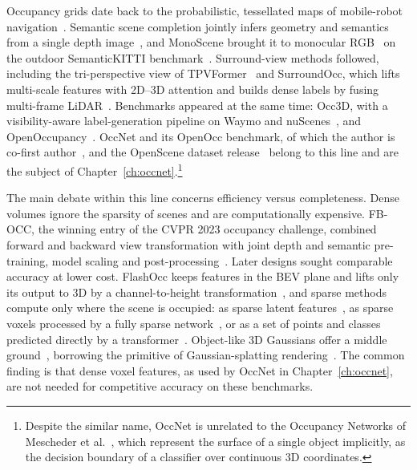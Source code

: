 Occupancy grids date back to the probabilistic, tessellated maps of mobile-robot navigation~\cite{elfes1989occupancy}. Semantic scene completion jointly infers geometry and semantics from a single depth image~\cite{song2017sscnet}, and MonoScene brought it to monocular RGB~\cite{cao2022monoscene} on the outdoor SemanticKITTI benchmark~\cite{behley2019semantickitti}. Surround-view methods followed, including the tri-perspective view of TPVFormer~\cite{huang2023tpvformer} and SurroundOcc, which lifts multi-scale features with 2D--3D attention and builds dense labels by fusing multi-frame LiDAR~\cite{wei2023surroundocc}. Benchmarks appeared at the same time: Occ3D, with a visibility-aware label-generation pipeline on Waymo and nuScenes~\cite{tian2023occ3d}, and OpenOccupancy~\cite{wang2023openoccupancy}. OccNet and its OpenOcc benchmark, of which the author is co-first author~\cite{sima2023occnet}, and the OpenScene dataset release~\cite{sima2023openscene} belong to this line and are the subject of Chapter~\ref{ch:occnet}.\footnote{Despite the similar name, OccNet is unrelated to the Occupancy Networks of Mescheder et al.~\cite{mescheder2019occupancy}, which represent the surface of a single object implicitly, as the decision boundary of a classifier over continuous 3D coordinates.}

The main debate within this line concerns efficiency versus completeness. Dense volumes ignore the sparsity of scenes and are computationally expensive. FB-OCC, the winning entry of the CVPR 2023 occupancy challenge, combined forward and backward view transformation with joint depth and semantic pre-training, model scaling and post-processing~\cite{li2023fbocc}. Later designs sought comparable accuracy at lower cost. FlashOcc keeps features in the BEV plane and lifts only its output to 3D by a channel-to-height transformation~\cite{yu2023flashocc}, and sparse methods compute only where the scene is occupied: as sparse latent features~\cite{tang2024sparseocc}, as sparse voxels processed by a fully sparse network~\cite{liu2024sparseocc}, or as a set of points and classes predicted directly by a transformer~\cite{wang2024opus}. Object-like 3D Gaussians offer a middle ground~\cite{huang2024gaussianformer,huang2025gaussianformer2}, borrowing the primitive of Gaussian-splatting rendering~\cite{kerbl2023gaussian}. The common finding is that dense voxel features, as used by OccNet in Chapter~\ref{ch:occnet}, are not needed for competitive accuracy on these benchmarks.

